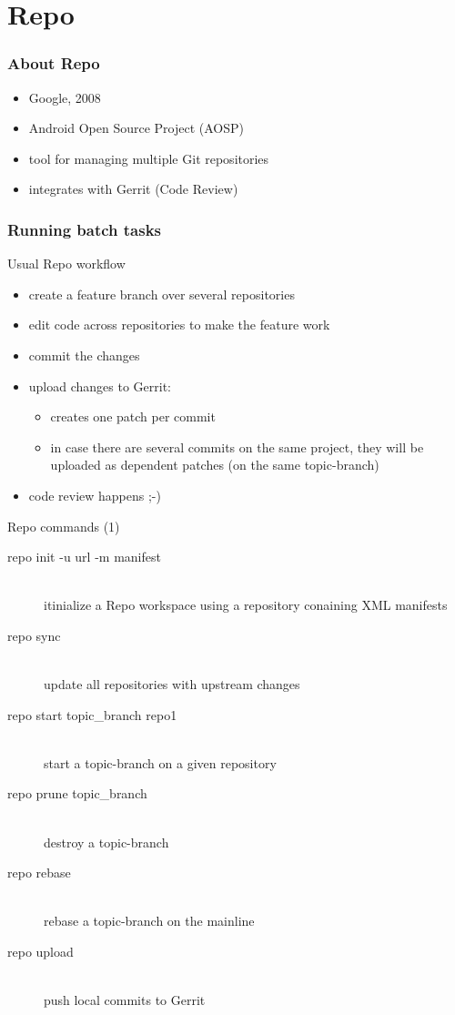 \section{Repo}
\begin{frame}
  \frametitle{About Repo}
  
  \begin{itemize}
    \item Google, 2008
    \item Android Open Source Project (AOSP)
    \item tool for managing multiple Git repositories
    \item integrates with Gerrit (Code Review)
  \end{itemize}
\end{frame}

\begin{frame}
  \frametitle{Running batch tasks}

  Usual Repo workflow
  \begin{itemize}
    \item create a feature branch over several repositories
    \item edit code across repositories to make the feature work
    \item commit the changes
    \item upload changes to Gerrit:
      \begin{itemize}
        \item creates one patch per commit
        \item in case there are several commits on the same project, they will be
          uploaded as dependent patches (on the same topic-branch)
      \end{itemize}
    \item code review happens ;-)
  \end{itemize}
\end{frame}

\begin{frame}{Repo commands (1)}
  \begin{description}
    \item[repo init -u url -m manifest] \hfill \\
      itinialize a Repo workspace using a repository conaining XML manifests
    \item[repo sync] \hfill \\
      update all repositories with upstream changes
    \item[repo start topic\_branch repo1] \hfill \\
      start a topic-branch on a given repository
    \item[repo prune topic\_branch] \hfill \\
      destroy a topic-branch
    \item[repo rebase] \hfill \\
      rebase a topic-branch on the mainline
    \item[repo upload] \hfill \\
      push local commits to Gerrit
  \end{description}
\end{frame}


